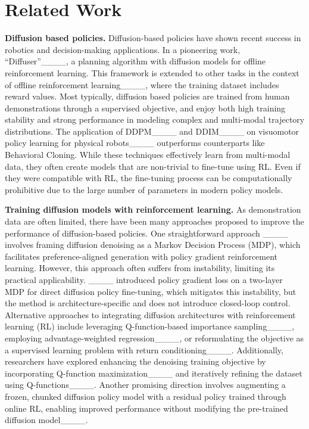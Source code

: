 \section{Related Work}

\textbf{Diffusion based policies.} 
Diffusion-based policies have shown recent success in robotics and decision-making applications. In a pioneering work, “Diffuser”____, a planning algorithm
with diffusion models for offline reinforcement learning.
This framework is extended to other tasks in the context of
offline reinforcement learning____, where the
training dataset includes reward values.
Most typically, diffusion based policies are trained from human demonstrations through a supervised objective, and enjoy both high training stability and strong performance in modeling complex and multi-modal trajectory distributions. 
The application of DDPM____ and DDIM____ on visuomotor policy learning for physical robots____ outperforms counterparts like Behavioral Cloning.
While these techniques effectively learn
from multi-modal data, they often create models that are non-trivial to fine-tune using RL. Even if they were compatible with RL, the fine-tuning process can be computationally prohibitive due to the large number of parameters in modern policy models. 

\textbf{Training diffusion models with reinforcement learning.} As demonstration data are often limited, there have been many approaches proposed to improve the performance of diffusion-based policies. 
One straightforward approach ____ involves framing diffusion denoising as a Markov Decision Process (MDP), which facilitates preference-aligned generation with policy gradient reinforcement learning. However, this approach often suffers from instability, limiting its practical applicability. ____ introduced policy gradient loss on a two-layer MDP for direct diffusion policy fine-tuning, which mitigates this instability, but the method is architecture-specific and does not introduce closed-loop control. 
Alternative approaches to integrating diffusion architectures with reinforcement learning (RL) include leveraging Q-function-based importance sampling____, employing advantage-weighted regression____, or reformulating the objective as a supervised learning problem with return conditioning____.
Additionally, researchers have explored enhancing the denoising training objective by incorporating Q-function maximization____ and iteratively refining the dataset using Q-functions____. 
Another promising direction involves augmenting a frozen, chunked diffusion policy model with a residual policy trained through online RL, enabling improved performance without modifying the pre-trained diffusion model____.



